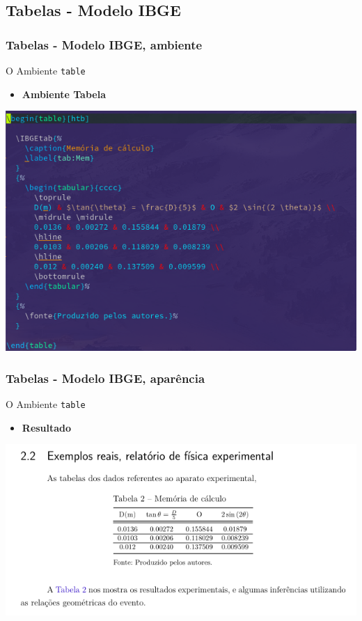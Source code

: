 \documentclass{beamer}
\begin{document}
\begin{frame}[fragile]
  \section{Tabelas - Modelo IBGE}
  \frametitle{Tabelas - Modelo IBGE, ambiente}
  \begin{center}
    \Large{O Ambiente \verb+table+}
  \vspace{0.42cm}
   \begin{itemize}
   \item \textbf{\large{Ambiente Tabela}}
  \end{itemize}
\end{center}
 \begin{center}
   \includegraphics[scale=0.40]{../Imagens/A2I61.png}
 \end{center}
 \end{frame}

\begin{frame}[fragile]
  \frametitle{Tabelas - Modelo IBGE, aparência}
  \begin{center}
    \Large{O Ambiente \verb+table+}

    \vspace{0.5cm}

   \begin{itemize}
   \item \textbf{Resultado}
   \end{itemize}

   \end{center}

 \begin{center}
   \includegraphics[scale=0.50]{../Imagens/A2I62.png}
\end{center}
\end{frame}
\end{document}
